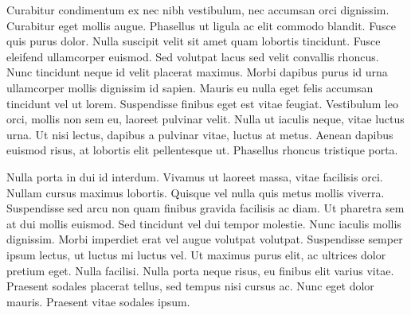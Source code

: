 \documentclass{article}
\begin{document}
Curabitur condimentum ex nec nibh vestibulum, nec accumsan orci dignissim.
Curabitur eget mollis augue. Phasellus ut ligula ac elit commodo blandit. Fusce
quis purus dolor. Nulla suscipit velit sit amet quam lobortis tincidunt. Fusce
eleifend ullamcorper euismod. Sed volutpat lacus sed velit convallis rhoncus.
Nunc tincidunt neque id velit placerat maximus. Morbi dapibus purus id urna
ullamcorper mollis dignissim id sapien. Mauris eu nulla eget felis accumsan
tincidunt vel ut lorem. Suspendisse finibus eget est vitae feugiat. Vestibulum
leo orci, mollis non sem eu, laoreet pulvinar velit. Nulla ut iaculis neque,
vitae luctus urna. Ut nisi lectus, dapibus a pulvinar vitae, luctus at metus.
Aenean dapibus euismod risus, at lobortis elit pellentesque ut. Phasellus
rhoncus tristique porta.


\noindent{}

Nulla porta in dui id interdum. Vivamus ut laoreet massa, vitae facilisis orci.
Nullam cursus maximus lobortis. Quisque vel nulla quis metus mollis viverra.
Suspendisse sed arcu non quam finibus gravida facilisis ac diam. Ut pharetra
sem at dui mollis euismod. Sed tincidunt vel dui tempor molestie. Nunc iaculis
mollis dignissim. Morbi imperdiet erat vel augue volutpat volutpat. Suspendisse
semper ipsum lectus, ut luctus mi luctus vel. Ut maximus purus elit, ac
ultrices dolor pretium eget. Nulla facilisi. Nulla porta neque risus, eu
finibus elit varius vitae. Praesent sodales placerat tellus, sed tempus nisi
cursus ac. Nunc eget dolor mauris. Praesent vitae sodales ipsum.

\end{document}
